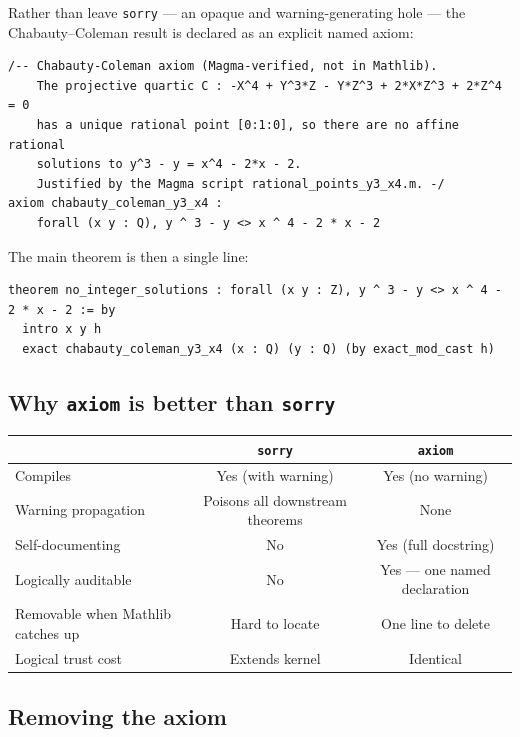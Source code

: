 \documentclass[12pt, a4paper]{article}
\theoremstyle{definition}
\begin{document}
Rather than leave \texttt{sorry} --- an opaque and warning-generating hole ---
the Chabauty--Coleman result is declared as an explicit named axiom:

\begin{lstlisting}[language=Lean4]
/-- Chabauty-Coleman axiom (Magma-verified, not in Mathlib).
    The projective quartic C : -X^4 + Y^3*Z - Y*Z^3 + 2*X*Z^3 + 2*Z^4 = 0
    has a unique rational point [0:1:0], so there are no affine rational
    solutions to y^3 - y = x^4 - 2*x - 2.
    Justified by the Magma script rational_points_y3_x4.m. -/
axiom chabauty_coleman_y3_x4 :
    forall (x y : Q), y ^ 3 - y <> x ^ 4 - 2 * x - 2
\end{lstlisting}

The main theorem is then a single line:

\begin{lstlisting}[language=Lean4]
theorem no_integer_solutions : forall (x y : Z), y ^ 3 - y <> x ^ 4 - 2 * x - 2 := by
  intro x y h
  exact chabauty_coleman_y3_x4 (x : Q) (y : Q) (by exact_mod_cast h)
\end{lstlisting}

\subsection{Why \texttt{axiom} is better than \texttt{sorry}}

\begin{center}
\renewcommand{\arraystretch}{1.2}
\begin{tabular}{lcc}
\toprule
 & \texttt{sorry} & \texttt{axiom} \\
\midrule
Compiles           & Yes (with warning) & Yes (no warning) \\
Warning propagation & Poisons all downstream theorems & None \\
Self-documenting   & No  & Yes (full docstring) \\
Logically auditable & No & Yes --- one named declaration \\
Removable when Mathlib catches up & Hard to locate & One line to delete \\
Logical trust cost & Extends kernel & Identical \\
\bottomrule
\end{tabular}
\end{center}

\subsection{Removing the axiom}
\end{document}
